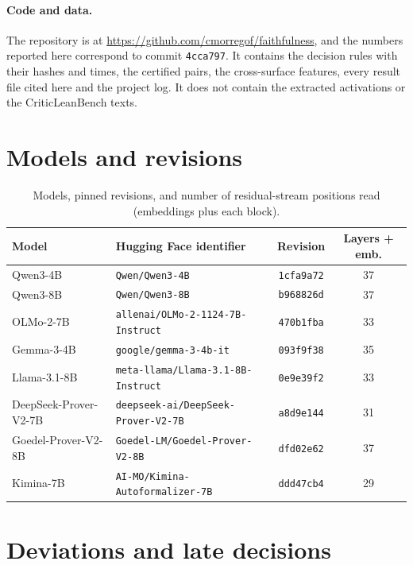 \documentclass[10pt]{article}
\newcommand{\vr}[1]{\texttt{#1}}
\begin{document}
\paragraph{Code and data.}
The repository is at \url{https://github.com/cmorregof/faithfulness}, and the numbers reported here correspond to
commit \vr{4cca797}. It contains the decision rules with their hashes and times, the certified pairs, the
cross-surface features, every result file cited here and the project log. It does not contain the extracted
activations or the CriticLeanBench texts.





\appendix
\section{Models and revisions}\label{app:modelos}
\begin{table}[h]
\centering
\caption{Models, pinned revisions, and number of residual-stream positions read (embeddings plus each block).}
\vspace{2pt}
\begin{tabular}{@{}llcc@{}}
\toprule
Model & Hugging Face identifier & Revision & Layers + emb.\\
\midrule
Qwen3-4B              & \vr{Qwen/Qwen3-4B}                         & \vr{1cfa9a72} & 37\\
Qwen3-8B              & \vr{Qwen/Qwen3-8B}                         & \vr{b968826d} & 37\\
OLMo-2-7B             & \vr{allenai/OLMo-2-1124-7B-Instruct}       & \vr{470b1fba} & 33\\
Gemma-3-4B            & \vr{google/gemma-3-4b-it}                  & \vr{093f9f38} & 35\\
Llama-3.1-8B          & \vr{meta-llama/Llama-3.1-8B-Instruct}      & \vr{0e9e39f2} & 33\\
DeepSeek-Prover-V2-7B & \vr{deepseek-ai/DeepSeek-Prover-V2-7B}     & \vr{a8d9e144} & 31\\
Goedel-Prover-V2-8B   & \vr{Goedel-LM/Goedel-Prover-V2-8B}         & \vr{dfd02e62} & 37\\
Kimina-7B             & \vr{AI-MO/Kimina-Autoformalizer-7B}        & \vr{ddd47cb4} & 29\\
\bottomrule
\end{tabular}
\end{table}

\section{Deviations and late decisions}\label{app:desviaciones}
\end{document}
